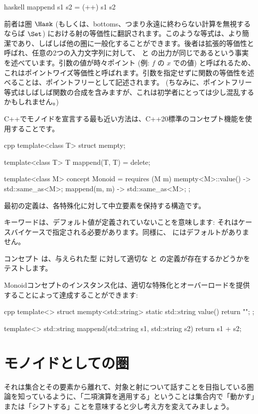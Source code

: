 \begin{snip}{haskell}
mappend s1 s2 = (++) s1 s2
\end{snip}
前者は圏 $\Hask$ (もしくは、bottoms、つまり永遠に終わらない計算を無視するならば $\Set$) における射の等価性に翻訳されます。このような等式は、より簡潔であり、しばしば他の圏に一般化することができます。後者は拡張的等価性と呼ばれ、任意の2つの入力文字列に対して、 と \code{(++)} の出力が同じであるという事実を述べています。引数の値が時々ポイント (例: $f$ の $x$ での値) と呼ばれるため、これはポイントワイズ等価性と呼ばれます。引数を指定せずに関数の等価性を述べることは、ポイントフリーとして記述されます。 (ちなみに、ポイントフリー等式はしばしば関数の合成を含みますが、これは初学者にとっては少し混乱するかもしれません。) 

C++でモノイドを宣言する最も近い方法は、C++20標準のコンセプト機能を使用することです。

\begin{snip}{cpp}
template<class T>
struct mempty;

template<class T>
T mappend(T, T) = delete;

template<class M>
concept Monoid = requires (M m) {
    { mempty<M>::value() } -> std::same_as<M>;
    { mappend(m, m) } -> std::same_as<M>;
};
\end{snip}
最初の定義は、各特殊化に対して中立要素を保持する構造です。

 キーワードは、デフォルト値が定義されていないことを意味します: それはケースバイケースで指定される必要があります。同様に、 にはデフォルトがありません。

コンセプト  は、与えられた型  に対して適切な  と  の定義が存在するかどうかをテストします。

Monoidコンセプトのインスタンス化は、適切な特殊化とオーバーロードを提供することによって達成することができます: 

\begin{snip}{cpp}
template<>
struct mempty<std::string> {
    static std::string value() { return ""; }
};

template<>
std::string mappend(std::string s1, std::string s2) {
    return s1 + s2;
}
\end{snip}

\section{モノイドとしての圏}

それは集合とその要素から離れて、対象と射について話すことを目指している圏論を知っているように、「二項演算を適用する」ということは集合内で「動かす」または「シフトする」ことを意味すると少し考え方を変えてみましょう。

